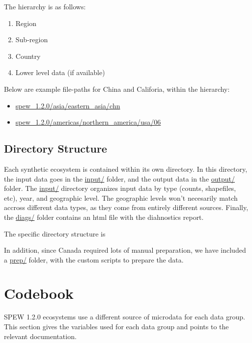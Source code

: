 \documentclass[font=9pt]{article}
\begin{document}
The hierarchy is as follows:

\begin{enumerate}
	\item Region
	\item Sub-region 
	\item Country
	\item Lower level data (if available)
\end{enumerate}

Below are example file-paths for China and Califoria, within the hierarchy:

\begin{itemize}
	\item \url{spew_1.2.0/asia/eastern_asia/chn}
	\item \url{spew_1.2.0/americas/northern_america/usa/06}
\end{itemize}

\subsection{Directory Structure}
Each synthetic ecosystem is contained within its own directory. In this directory, the input data goes in the \url{input/} folder, and the output data in the \url{output/} folder. The \url{input/} directory organizes input data by type (counts, shapefiles, etc), year, and geographic level. The geographic levels won't necesarily match accross different data types, as they come from entirely different sources. Finally, the \url{diags/} folder contains an html file with the diahnostics report. 

The specific directory structure is

\newpage
{}

In addition, since Canada required lots of manual preparation, we have included a \url{prep/} folder, with the custom scripts to prepare the data. 

\newpage



\newpage 
\appendix

\section{Codebook}
SPEW 1.2.0 ecosystems use a different source of microdata for each data group. This section gives the variables used for each data group and points to the relevant documentation. 
\end{document}
